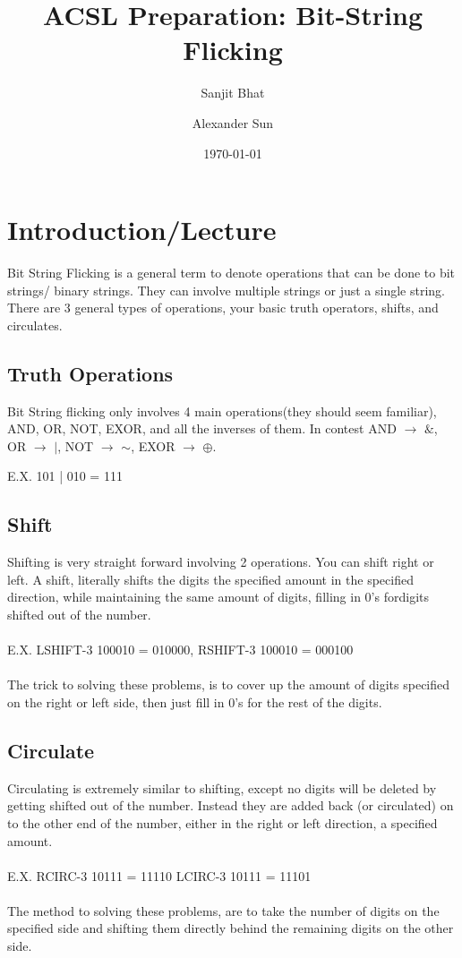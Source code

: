 \documentclass[11pt,letterpaper]{article}
\title{ACSL Preparation: Bit-String Flicking}
\author{Sanjit Bhat \and Alexander Sun}
\date{\today}
\begin{document}
\maketitle

\section{Introduction/Lecture}
Bit String Flicking is a general term to denote operations that can be done to bit strings/ binary strings. They can involve multiple strings or just a single string. There are 3 general types of operations, your basic truth operators, shifts, and circulates.
\subsection{Truth Operations}
Bit String flicking only involves 4 main operations(they should seem familiar), AND, OR, NOT, EXOR, and all the inverses of them. In contest AND $\rightarrow$ $\&$, OR $\rightarrow$ $\mid$, NOT $\rightarrow$ $\sim$,  EXOR $\rightarrow$ $\oplus$.

E.X. 101 | 010 = 111
\subsection{Shift}
Shifting is very straight forward involving 2 operations. You can shift right or left. A shift, literally shifts the digits the specified amount in the specified direction, while maintaining the same amount of digits, filling in 0's fordigits shifted out of the number.
\\
\\
E.X. LSHIFT-3 100010 =  010000, RSHIFT-3 100010 = 000100
\\
\\
The trick to solving these problems, is to cover up the amount of digits specified on the right or left side, then just fill in 0's for the rest of the digits.
\subsection{Circulate}
Circulating is extremely similar to shifting, except no digits will be deleted by getting shifted out of the number. Instead they are added back (or circulated) on to the other end of the number, either in the right or left direction, a specified amount.
\\
\\
E.X. RCIRC-3    10111 = 11110         LCIRC-3   10111 = 11101
\\
\\
The method to solving these problems, are to take the number of digits on the specified side and shifting them directly behind the remaining digits on the other side.
\end{document}
